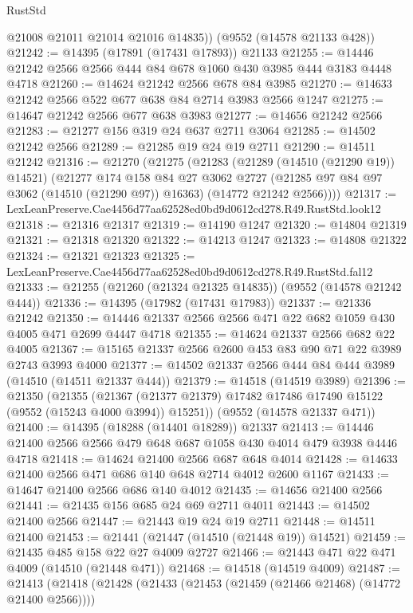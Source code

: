 \begin{lexlean}{RustStd}
\begin{coremodule}
        @21008
        @21011
        @21014
        @21016
        @14835))
    (@9552 (@14578 @21133 @428))
@21242 := @14395 (@17891 (@17431 @17893)) @21133
@21255 := @14446 @21242 @2566 @2566 @444 @84 @678 @1060 @430 @3985 @444 @3183 @4448 @4718
@21260 := @14624 @21242 @2566 @678 @84 @3985
@21270 := @14633 @21242 @2566 @522 @677 @638 @84 @2714 @3983 @2566 @1247
@21275 := @14647 @21242 @2566 @677 @638 @3983
@21277 := @14656 @21242 @2566
@21283 := @21277 @156 @319 @24 @637 @2711 @3064
@21285 := @14502 @21242 @2566
@21289 := @21285 @19 @24 @19 @2711
@21290 := @14511 @21242
@21316 := @21270
    (@21275
      (@21283
        (@21289 (@14510 (@21290 @19)) @14521)
        (@21277
          @174
          @158
          @84
          @27
          @3062
          @2727
          (@21285 @97 @84 @97 @3062 (@14510 (@21290 @97)) @16363)
          (@14772 @21242 @2566))))
@21317 := LexLeanPreserve.Cae4456d77aa62528ed0bd9d0612cd278.R49.RustStd.look12
@21318 := @21316 @21317
@21319 := @14190 @1247
@21320 := @14804 @21319
@21321 := @21318 @21320
@21322 := @14213 @1247
@21323 := @14808 @21322
@21324 := @21321 @21323
@21325 := LexLeanPreserve.Cae4456d77aa62528ed0bd9d0612cd278.R49.RustStd.fal12
@21333 := @21255 (@21260 (@21324 @21325 @14835)) (@9552 (@14578 @21242 @444))
@21336 := @14395 (@17982 (@17431 @17983))
@21337 := @21336 @21242
@21350 := @14446 @21337 @2566 @2566 @471 @22 @682 @1059 @430 @4005 @471 @2699 @4447 @4718
@21355 := @14624 @21337 @2566 @682 @22 @4005
@21367 := @15165 @21337 @2566 @2600 @453 @83 @90 @71 @22 @3989 @2743 @3993 @4000
@21377 := @14502 @21337 @2566 @444 @84 @444 @3989 (@14510 (@14511 @21337 @444))
@21379 := @14518 (@14519 @3989)
@21396 := @21350
    (@21355
      (@21367 (@21377 @21379) @17482 @17486 @17490 @15122 (@9552 (@15243 @4000 @3994)) @15251))
    (@9552 (@14578 @21337 @471))
@21400 := @14395 (@18288 (@14401 @18289)) @21337
@21413 := @14446 @21400 @2566 @2566 @479 @648 @687 @1058 @430 @4014 @479 @3938 @4446 @4718
@21418 := @14624 @21400 @2566 @687 @648 @4014
@21428 := @14633 @21400 @2566 @471 @686 @140 @648 @2714 @4012 @2600 @1167
@21433 := @14647 @21400 @2566 @686 @140 @4012
@21435 := @14656 @21400 @2566
@21441 := @21435 @156 @685 @24 @69 @2711 @4011
@21443 := @14502 @21400 @2566
@21447 := @21443 @19 @24 @19 @2711
@21448 := @14511 @21400
@21453 := @21441 (@21447 (@14510 (@21448 @19)) @14521)
@21459 := @21435 @485 @158 @22 @27 @4009 @2727
@21466 := @21443 @471 @22 @471 @4009 (@14510 (@21448 @471))
@21468 := @14518 (@14519 @4009)
@21487 := @21413
    (@21418
      (@21428
        (@21433 (@21453 (@21459 (@21466 @21468) (@14772 @21400 @2566))))

\end{coremodule}
\end{lexlean}
